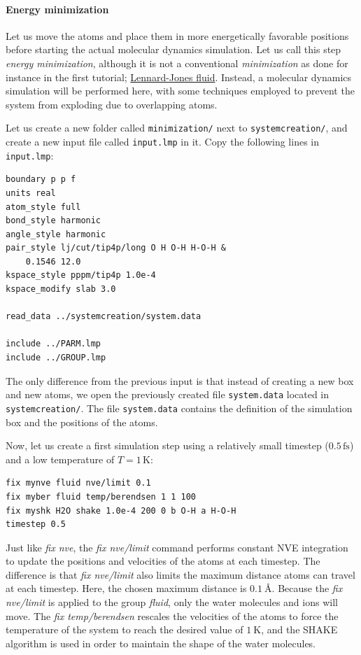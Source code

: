 \documentclass[9pt,tutorial]{livecoms}
\newcommand{\flrcmd}[1]{\textcolor{command}{\texttt{#1}}} %
\newcommand{\flecmd}[1]{\textcolor{command}{\texttt{#1}}} %
\begin{document}
\paragraph{Energy minimization}
Let us move the atoms and place them in more energetically favorable positions
before starting the actual molecular dynamics simulation. Let us call this step
\textit{energy minimization}, although it is not a conventional \textit{minimization}
as done for instance in the first tutorial; \hyperref[lennard-jones-label]{Lennard-Jones fluid}.
Instead, a molecular dynamics simulation will be performed here, with some techniques
employed to prevent the system from exploding due to overlapping atoms.

Let us create a new folder called \flrcmd{minimization/} next to \flrcmd{systemcreation/},
and create a new input file called \flecmd{input.lmp} in it. Copy the following lines
in \flecmd{input.lmp}:
\begin{lstlisting}
boundary p p f
units real
atom_style full
bond_style harmonic
angle_style harmonic
pair_style lj/cut/tip4p/long O H O-H H-O-H &
    0.1546 12.0
kspace_style pppm/tip4p 1.0e-4
kspace_modify slab 3.0

read_data ../systemcreation/system.data

include ../PARM.lmp
include ../GROUP.lmp
\end{lstlisting}
The only difference from the previous input is that instead of creating a new
box and new atoms, we open the previously created file \flecmd{system.data}
located in \flrcmd{systemcreation/}. The file \flecmd{system.data} contains the
definition of the simulation box and the positions of the atoms.

Now, let us create a first simulation step using a relatively small
timestep ($0.5\,\text{fs}$) and a low temperature of $T = 1\,\text{K}$:
\begin{lstlisting}
fix mynve fluid nve/limit 0.1
fix myber fluid temp/berendsen 1 1 100
fix myshk H2O shake 1.0e-4 200 0 b O-H a H-O-H
timestep 0.5
\end{lstlisting}
Just like \textit{fix nve}, the \textit{fix nve/limit} command performs constant
NVE integration to update the positions and velocities of the atoms at each
timestep. The difference is that \textit{fix nve/limit} also limits the maximum
distance atoms can travel at each timestep. Here, the chosen maximum distance
is $0.1~\text{\AA{}}$. Because the \textit{fix nve/limit} is applied to the
group \textit{fluid}, only the water molecules and ions will move.
The \textit{fix temp/berendsen} rescales the velocities of the atoms to
force the temperature of the system to reach the desired value of $1~\text{K}$,
and the SHAKE algorithm is used in order to maintain the shape of the water molecules.
\end{document}
